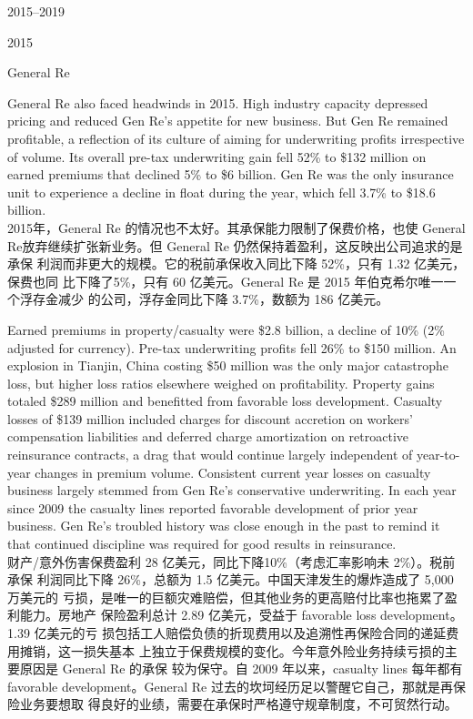 \begin{chapter}{2015--2019}
\begin{section}{2015}
\begin{subsection}{General Re}
\begin{verseparallel}
  {
    General Re also faced headwinds in 2015. High industry capacity depressed
    pricing and reduced Gen Re's appetite for new business. But Gen Re remained
    profitable, a reflection of its culture of aiming for underwriting profits
    irrespective of volume. Its overall pre-tax underwriting gain fell 52\% to
    \$132 million on earned premiums that declined 5\% to \$6 billion. Gen Re was
    the only insurance unit to experience a decline in float during the year,
    which fell 3.7\% to \$18.6 billion. \\
  }
  {
    2015年，General Re 的情况也不太好。其承保能力限制了保费价格，也使 General
    Re放弃继续扩张新业务。但 General Re 仍然保持着盈利，这反映出公司追求的是承保
    利润而非更大的规模。它的税前承保收入同比下降 52\%，只有 1.32 亿美元，保费也同
    比下降了5\%，只有 60 亿美元。General Re 是 2015 年伯克希尔唯一一个浮存金减少
    的公司，浮存金同比下降 3.7\%，数额为 186 亿美元。
  }
\end{verseparallel}

\begin{verseparallel}
  {
    Earned premiums in property/casualty were \$2.8 billion, a decline of 10\%
    (2\% adjusted for currency). Pre-tax underwriting profits fell 26\% to \$150
    million. An explosion in Tianjin, China costing \$50 million was the only
    major catastrophe loss, but higher loss ratios elsewhere weighed on
    profitability. Property gains totaled \$289 million and benefitted from
    favorable loss development. Casualty losses of \$139 million included
    charges for discount accretion on workers' compensation liabilities and
    deferred charge amortization on retroactive reinsurance contracts, a drag
    that would continue largely independent of year-to-year changes in premium
    volume. Consistent current year losses on casualty business largely stemmed
    from Gen Re's conservative underwriting. In each year since 2009 the
    casualty lines reported favorable development of prior year business. Gen
    Re's troubled history was close enough in the past to remind it that
    continued discipline was required for good results in reinsurance. \\
  }
  {
    财产/意外伤害保费盈利 28 亿美元，同比下降10\%（考虑汇率影响未 2\%）。税前承保
    利润同比下降 26\%，总额为 1.5 亿美元。中国天津发生的爆炸造成了 5,000 万美元的
    亏损，是唯一的巨额灾难赔偿，但其他业务的更高赔付比率也拖累了盈利能力。房地产
    保险盈利总计 2.89 亿美元，受益于 favorable loss development。1.39 亿美元的亏
    损包括工人赔偿负债的折现费用以及追溯性再保险合同的递延费用摊销，这一损失基本
    上独立于保费规模的变化。今年意外险业务持续亏损的主要原因是 General Re 的承保
    较为保守。自 2009 年以来，casualty lines 每年都有 favorable
    development。General Re 过去的坎坷经历足以警醒它自己，那就是再保险业务要想取
    得良好的业绩，需要在承保时严格遵守规章制度，不可贸然行动。
  }
\end{verseparallel}


\end{subsection}
\end{section}
\end{chapter}
